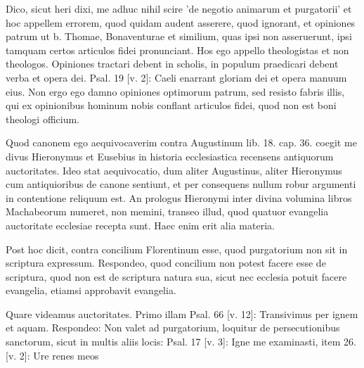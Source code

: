 Dico, sicut heri dixi, me adhuc nihil scire 'de negotio animarum et purgatorii' et hoc appellem errorem, quod quidam audent asserere, quod ignorant, et opiniones patrum ut b. Thomae, Bonaventurae et similium, quas ipsi non asseruerunt, ipsi tamquam certos articulos fidei pronunciant. Hos ego appello theologistas et non theologos. Opiniones tractari debent in scholis, in populum praedicari debent verba et opera dei. Psal. 19 [v. 2]: Caeli enarrant gloriam dei et opera manuum eius. Non ergo ego damno opiniones optimorum patrum, sed resisto fabris illis, qui ex opinionibus hominum nobis conflant articulos fidei, quod non est boni theologi officium.

Quod canonem ego aequivocaverim contra Augustinum lib. 18. cap. 36. coegit me divus Hieronymus et Eusebius in historia ecclesiastica recensens antiquorum auctoritates. Ideo stat aequivocatio, dum aliter Augustinus, aliter Hieronymus cum antiquioribus de canone sentiunt, et per consequens nullum robur argumenti in contentione reliquum est. An prologus Hieronymi inter divina volumina libros Machabeorum numeret, non memini, transeo illud, quod quatuor evangelia auctoritate ecclesiae recepta sunt. Haec enim erit alia materia.

Post hoc dicit, contra concilium Florentinum esse, quod purgatorium non sit in scriptura expressum. Respondeo, quod concilium non potest facere esse de scriptura, quod non est de scriptura natura sua, sicut nec ecclesia potuit facere evangelia, etiamsi approbavit evangelia.

Quare videamus auctoritates. Primo illam Psal. 66 [v. 12]: Transivimus per ignem et aquam. Respondeo: Non valet ad purgatorium, loquitur de persecutionibus sanctorum, sicut in multis aliis locis: Psal. 17 [v. 3]: Igne me examinasti, item 26. [v. 2]: Ure renes meos


